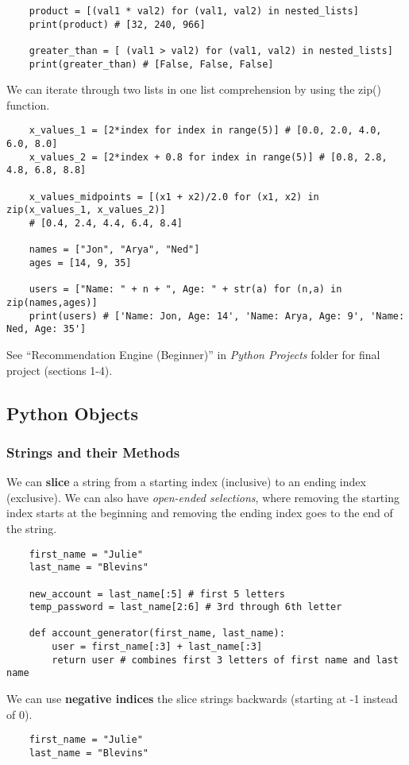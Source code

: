 \documentclass[11pt, a4paper]{article}
\begin{document}
\begin{spacing}{1.1}
\begin{lstlisting}
	product = [(val1 * val2) for (val1, val2) in nested_lists]
	print(product) # [32, 240, 966]	
	
	greater_than = [ (val1 > val2) for (val1, val2) in nested_lists]
	print(greater_than) # [False, False, False] \end{lstlisting}\vspace*{1mm}
	We can iterate through two lists in one list comprehension by using the zip() function.
	\begin{lstlisting}
	x_values_1 = [2*index for index in range(5)] # [0.0, 2.0, 4.0, 6.0, 8.0] 
	x_values_2 = [2*index + 0.8 for index in range(5)] # [0.8, 2.8, 4.8, 6.8, 8.8] 
	
	x_values_midpoints = [(x1 + x2)/2.0 for (x1, x2) in zip(x_values_1, x_values_2)]
	# [0.4, 2.4, 4.4, 6.4, 8.4]	
	
	names = ["Jon", "Arya", "Ned"]
	ages = [14, 9, 35]
	
	users = ["Name: " + n + ", Age: " + str(a) for (n,a) in zip(names,ages)]
	print(users) # ['Name: Jon, Age: 14', 'Name: Arya, Age: 9', 'Name: Ned, Age: 35'] \end{lstlisting} \vspace*{2mm}
	See ``Recommendation Engine (Beginner)'' in \textit{Python Projects} folder for final project (sections 1-4).\vspace*{4mm}
		
	\subsection{Python Objects}
	\subsubsection{Strings and their Methods}
	We can \textbf{slice} a string from a starting index (inclusive) to an ending index (exclusive). We can also have \textit{open-ended selections}, where removing the starting index starts at the beginning and removing the ending index goes to the end of the string.
	\begin{lstlisting}
	first_name = "Julie"
	last_name = "Blevins"
	
	new_account = last_name[:5] # first 5 letters
	temp_password = last_name[2:6] # 3rd through 6th letter 
	
	def account_generator(first_name, last_name):
		user = first_name[:3] + last_name[:3]
		return user # combines first 3 letters of first name and last name \end{lstlisting} \newpage
	\noindent We can use \textbf{negative indices} the slice strings backwards (starting at -1 instead of 0). 
	\begin{lstlisting}
	first_name = "Julie"
	last_name = "Blevins"
	

\end{lstlisting}
\end{spacing}
\end{document}
